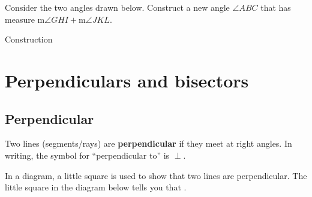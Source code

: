 \begin{exercises}
\begin{ex}
Consider the two angles drawn below.  Construct a new angle $\angle ABC$ that has measure m$\angle GHI + \text{m}\angle JKL$.


\vfill
\begin{sol}
Construction
\end{sol}
\end{ex}

\end{exercises}

\newpage

			\section{Perpendiculars and bisectors}

\subsection{Perpendicular}
Two lines (segments/rays) are \textbf{perpendicular} if they meet at right angles.  In writing, the symbol for ``perpendicular to'' is $\perp$.

In a diagram, a little square is used to show that two lines are perpendicular. 
The little square in the diagram below tells you that .

	\begin{center}
	\end{center}

